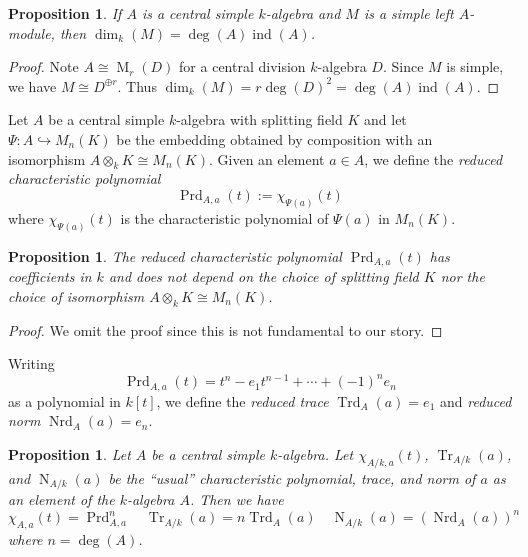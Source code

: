 \documentclass[12pt]{article}
\theoremstyle{plain}
\newtheorem{proposition}[theorem]{Proposition}
\theoremstyle{definition}
\theoremstyle{remark}
\numberwithin{equation}{section}
\begin{document}
\begin{proposition}
If $A$ is a central simple $k$-algebra and
$M$ is a simple left $A$-module, then
$\dim_k(M) =\deg(A) \operatorname{ind}(A)$.
\end{proposition}

\begin{proof}
Note $A \cong \operatorname{M}_r(D)$ for a central division $k$-algebra
$D$.
Since $M$ is simple, we have $M \cong D^{\oplus r}$.
Thus $\dim_k(M) = r \deg(D)^2=\deg(A) \operatorname{ind}(A)$.
\end{proof}

Let $A$ be a central simple $k$-algebra with splitting field $K$
and let $\Psi : A \hookrightarrow M_n(K)$ be the embedding
obtained by composition with an isomorphism $A \otimes_k K \cong
M_n(K)$.
Given an element $a \in A$, we define the
\emph{reduced characteristic polynomial}
\[
\operatorname{Prd}_{A,a}(t) := \chi_{\Psi(a)}(t)
\]
where $\chi_{\Psi(a)}(t)$ is the characteristic polynomial
of $\Psi(a)$ in $M_n(K)$.

\begin{proposition}
The reduced characteristic polynomial
$\operatorname{Prd}_{A,a}(t)$ has coefficients in $k$ and does not depend on
the choice of splitting field $K$ nor the choice of isomorphism
$A \otimes_k K \cong M_n(K)$.
\end{proposition}

\begin{proof}
We omit the proof since this is not fundamental to our story.
\end{proof}

Writing
\[
\operatorname{Prd}_{A,a}(t) = t^n - e_1t^{n-1} + \cdots + (-1)^n e_n
\]
as a polynomial in $k[t]$, we define
the \emph{reduced trace} $\operatorname{Trd}_A(a)=e_1$
and \emph{reduced norm} $\operatorname{Nrd}_A(a)=e_n$.

\begin{proposition}
Let $A$ be a central simple $k$-algebra.
Let $\chi_{A/k,a}(t)$, $\operatorname{Tr}_{A/k}(a)$, and
$\operatorname{N}_{A/k}(a)$
be the ``usual'' characteristic polynomial, trace, and norm
of $a$ as an element of the $k$-algebra $A$.
Then we have
\[
\chi_{A,a}(t)=\operatorname{Prd}_{A,a}^n \quad
\operatorname{Tr}_{A/k}(a)=n\operatorname{Trd}_A(a) \quad
\operatorname{N}_{A/k}(a)=\left(\operatorname{Nrd}_A(a)\right)^n
\]
where $n=\deg(A)$.
\end{proposition}



\end{document}

